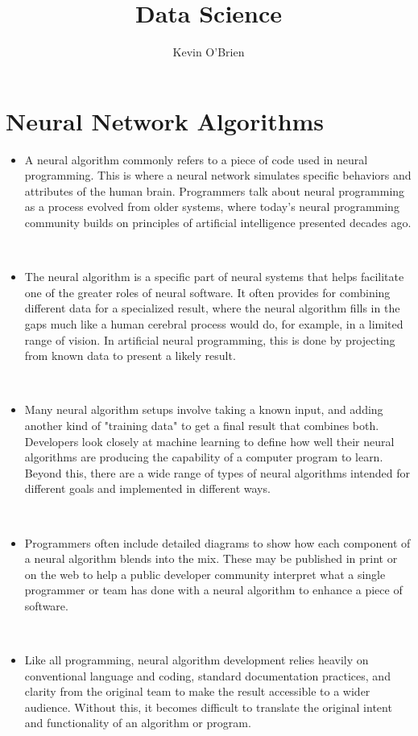 \documentclass[12pt]{article}
\title{Data Science}
\author{Kevin O'Brien}
\begin{document}
	\section*{Neural Network Algorithms}
	
	\begin{itemize}

\item A neural algorithm commonly refers to a piece of code used in neural programming. This is where a neural network simulates specific behaviors and attributes of the human brain. Programmers talk about neural programming as a process evolved from older systems, where today's neural programming community builds on principles of artificial intelligence presented decades ago.

 

\item The neural algorithm is a specific part of neural systems that helps facilitate one of the greater roles of neural software. It often provides for combining different data for a specialized result, where the neural algorithm fills in the gaps much like a human cerebral process would do, for example, in a limited range of vision. In artificial neural programming, this is done by projecting from known data to present a likely result.

 

\item Many neural algorithm setups involve taking a known input, and adding another kind of "training data" to get a final result that combines both. Developers look closely at machine learning to define how well their neural algorithms are producing the capability of a computer program to learn. Beyond this, there are a wide range of types of neural algorithms intended for different goals and implemented in different ways.

 
\item
Programmers often include detailed diagrams to show how each component of a neural algorithm blends into the mix. These may be published in print or on the web to help a public developer community interpret what a single programmer or team has done with a neural algorithm to enhance a piece of software.

 
\item 
Like all programming, neural algorithm development relies heavily on conventional language and coding, standard documentation practices, and clarity from the original team to make the result accessible to a wider audience. Without this, it becomes difficult to translate the original intent and functionality of an algorithm or program.


\end{itemize}
\end{document}

